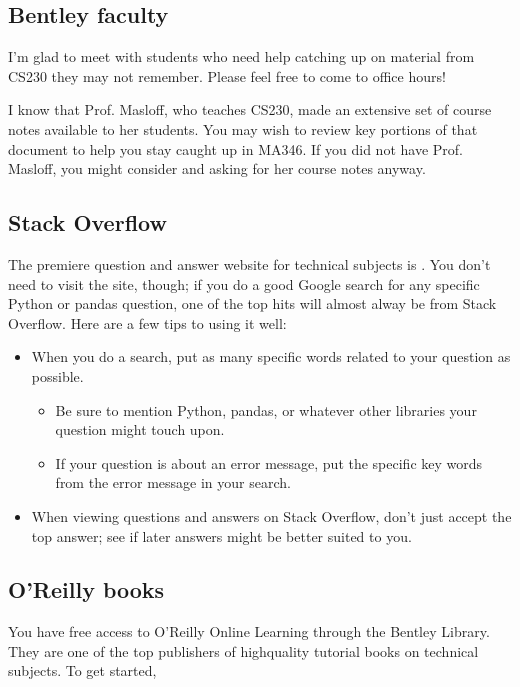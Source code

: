 \documentclass[letterpaper,10pt,english]{sphinxmanual}
\begin{document}
\subsection{Bentley faculty}
\label{\detokenize{chapter-4-review-of-python-and-pandas:bentley-faculty}}
I’m glad to meet with students who need help catching up on material from CS230 they may not remember.  Please feel free to come to office hours!

I know that Prof. Masloff, who teaches CS230, made an extensive set of course notes available to her students.  You may wish to review key portions of that document to help you stay caught up in MA346.  If you did not have Prof. Masloff, you might consider  and asking for her course notes anyway.


\subsection{Stack Overflow}
\label{\detokenize{chapter-4-review-of-python-and-pandas:stack-overflow}}
The premiere question and answer website for technical subjects is .  You don’t need to visit the site, though; if you do a good Google search for any specific Python or pandas question, one of the top hits will almost alway be from Stack Overflow.  Here are a few tips to using it well:
\begin{itemize}
\item {} 
When you do a search, put as many specific words related to your question as possible.
\begin{itemize}
\item {} 
Be sure to mention Python, pandas, or whatever other libraries your question might touch upon.

\item {} 
If your question is about an error message, put the specific key words from the error message in your search.

\end{itemize}

\item {} 
When viewing questions and answers on Stack Overflow, don’t just accept the top answer; see if later answers might be better suited to you.

\end{itemize}


\subsection{O’Reilly books}
\label{\detokenize{chapter-4-review-of-python-and-pandas:o-reilly-books}}
You have free access to O’Reilly Online Learning through the Bentley Library.  They are one of the top publishers of high\sphinxhyphen{}quality tutorial books on technical subjects.  To get started, 
\end{document}
